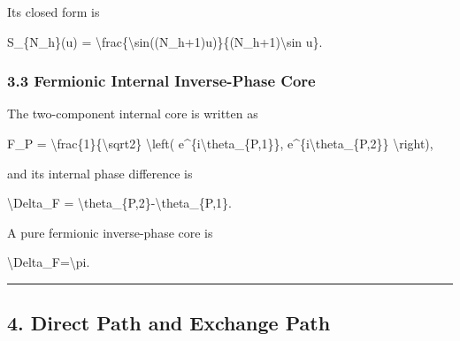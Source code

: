 \documentclass[
  a4paper,
]{article}
\newenvironment{Shaded}{}{}
\newcommand{\NormalTok}[1]{#1}
\begin{document}
Its closed form is

\begin{Shaded}
\begin{Highlighting}[]
\NormalTok{S\_\{N\_h\}(u)}
\NormalTok{=}
\NormalTok{\textbackslash{}frac\{\textbackslash{}sin((N\_h+1)u)\}\{(N\_h+1)\textbackslash{}sin u\}.}
\end{Highlighting}
\end{Shaded}

\subsubsection{3.3 Fermionic Internal Inverse-Phase
Core}\label{fermionic-internal-inverse-phase-core}

The two-component internal core is written as

\begin{Shaded}
\begin{Highlighting}[]
\NormalTok{F\_P}
\NormalTok{=}
\NormalTok{\textbackslash{}frac\{1\}\{\textbackslash{}sqrt2\}}
\NormalTok{\textbackslash{}left(}
\NormalTok{e\^{}\{i\textbackslash{}theta\_\{P,1\}\},}
\NormalTok{e\^{}\{i\textbackslash{}theta\_\{P,2\}\}}
\NormalTok{\textbackslash{}right),}
\end{Highlighting}
\end{Shaded}

and its internal phase difference is

\begin{Shaded}
\begin{Highlighting}[]
\NormalTok{\textbackslash{}Delta\_F}
\NormalTok{=}
\NormalTok{\textbackslash{}theta\_\{P,2\}{-}\textbackslash{}theta\_\{P,1\}.}
\end{Highlighting}
\end{Shaded}

A pure fermionic inverse-phase core is

\begin{Shaded}
\begin{Highlighting}[]
\NormalTok{\textbackslash{}Delta\_F=\textbackslash{}pi.}
\end{Highlighting}
\end{Shaded}

\begin{center}\rule{0.5\linewidth}{0.5pt}\end{center}

\subsection{4. Direct Path and Exchange
Path}\label{direct-path-and-exchange-path}
\end{document}
